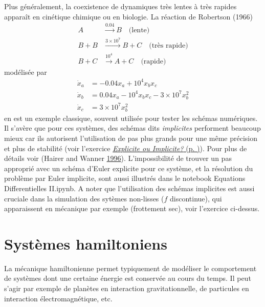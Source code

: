 Plus généralement, la coexistence de dynamiques très lentes à très
rapides apparaît en cinétique chimique ou en biologie. La réaction de
Robertson (1966) \begin{align*}
A & \stackrel{0.04}{\longrightarrow}  B \quad \text{(lente)} \\ 
B + B & \stackrel{3 \times 10^7}{\longrightarrow}  B + C \quad \text{(très rapide)}  \\
B + C & \stackrel{10^4}{\longrightarrow}  A + C  \quad \text{(rapide)} 
\end{align*} modélisée par \begin{align*}
\dot{x}_a &= -0.04 x_a + 10^4 x_bx_c \\
\dot{x}_b &= 0.04 x_a - 10^4 x_bx_c - 3\times 10^7 x_b^2\\
\dot{x}_c &= 3\times 10^7 x_b^2
\end{align*} en est un exemple classique, souvent utilisée pour tester
les schémas numériques. Il s'avère que pour ces systèmes, des schémas
dits \emph{implicites} performent beaucoup mieux car ils autorisent
l'utilisation de pas plus grands pour une même précision et plus de
stabilité (voir l'exercice
\protect\hyperlink{ed2-exo_exp_impl}{\emph{Explicite ou Implicite?} (p.
\pageref*{ed2-exo_exp_impl})}). Pour plus de détails voir (Hairer and Wanner
\protect\hyperlink{ed2-ref-Hairer96}{1996}). L'impossibilité de trouver un
pas approprié avec un schéma d'Euler explicite pour ce système, et la r\'esolution du probl\`eme par Euler implicite, sont aussi
illustrés dans le notebook Equations Differentielles II.ipynb. A  noter que l'utilisation des sch\'emas implicites est aussi cruciale dans la simulation des syt\`emes non-lisses ($f$ discontinue), qui apparaissent en m\'ecanique par exemple (frottement sec), voir l'exercice ci-dessus.

\hypertarget{ed2-sec_systHamiltoniens}{%
\section{Systèmes hamiltoniens}\label{ed2-sec_systHamiltoniens}}

La mécanique hamiltonienne permet typiquement de modéliser le
comportement de systèmes dont une certaine énergie est conservée au
cours du temps. Il peut s'agir par exemple de planètes en interaction
gravitationnelle, de particules en interaction électromagnétique, etc.

